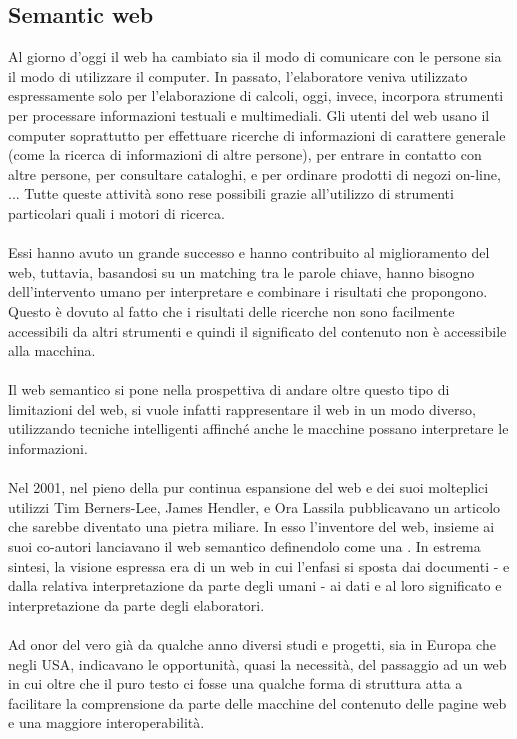 \documentclass{article}
\theoremstyle{plain}
\theoremstyle{definition}
\begin{document}
\subsection{Semantic web}
Al giorno d'oggi il web ha cambiato sia il modo di comunicare con le persone sia il modo di utilizzare il computer. In passato, l'elaboratore veniva utilizzato espressamente solo per l'elaborazione di calcoli, oggi, invece, incorpora strumenti per processare informazioni testuali e multimediali. Gli utenti del web usano il computer soprattutto per effettuare ricerche di informazioni di carattere generale (come la ricerca di informazioni di altre persone), per entrare in contatto con altre persone, per consultare cataloghi, e per ordinare prodotti di negozi on-line, ... Tutte queste attività sono rese possibili grazie all'utilizzo di strumenti particolari quali i motori di ricerca. 
\\
\\
Essi hanno avuto un grande successo e hanno contribuito al miglioramento del web, tuttavia, basandosi su un matching tra le parole chiave, hanno bisogno dell'intervento umano per interpretare e combinare i risultati che propongono. Questo è dovuto al fatto che i risultati delle ricerche non sono facilmente accessibili da altri strumenti e quindi il significato del contenuto non è accessibile alla macchina. 
\\
\\
Il web semantico si pone nella prospettiva di andare oltre questo tipo di limitazioni del web, si vuole infatti rappresentare il web in un modo diverso, utilizzando tecniche intelligenti affinché anche le macchine possano interpretare le informazioni.
\\
\\
Nel 2001, nel pieno della pur continua espansione del web e dei suoi molteplici utilizzi Tim Berners-Lee, James Hendler, e Ora Lassila pubblicavano un articolo che sarebbe diventato una pietra miliare. In esso l'inventore del web, insieme ai suoi co-autori lanciavano il web semantico definendolo come una . In estrema sintesi, la visione espressa era di un web in cui l'enfasi si sposta dai documenti - e dalla relativa interpretazione da parte degli umani - ai dati e al loro significato e interpretazione da parte degli elaboratori.
\\ 
\\
Ad onor del vero già da qualche anno diversi studi e progetti, sia in Europa che negli USA, indicavano le opportunità, quasi la necessità, del passaggio ad un web in cui oltre che il puro testo ci fosse una qualche forma di struttura atta a facilitare la comprensione da parte delle macchine del contenuto delle pagine web e una maggiore interoperabilità. 
\end{document}
